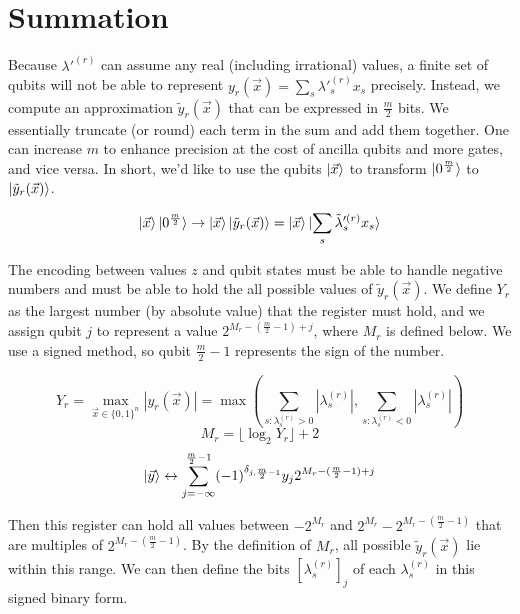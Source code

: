 \section{Summation}

Because $\lambda'^{(r)}$ can assume any real (including irrational) values, a finite set of qubits will not be able to represent $y_r(\vec{x}) = \sum_s \lambda'^{(r)}_s x_s$ precisely. Instead, we compute an approximation $\tilde{y}_r(\vec{x})$ that can be expressed in $\frac{m}{2}$ bits. We essentially truncate (or round) each term in the sum and add them together. One can increase $m$ to enhance precision at the cost of ancilla qubits and more gates, and vice versa. In short, we'd like to use the qubits $\ket{\vec{x}}$ to transform $\ket{0^{\frac{m}{2}}}$ to $\ket{\tilde{y}_r(\vec{x})}$.

\begin{equation}
    \ket{\vec{x}}\ket{0^{\frac{m}{2}}} \rightarrow \ket{\vec{x}}\ket{\tilde{y}_r(\vec{x})} = \ket{\vec{x}}\ket{\sum_s \tilde{\lambda}'^{(r)}_s x_s}
    \label{eq: summation2}
\end{equation}

The encoding between values $z$ and qubit states must be able to handle negative numbers and must be able to hold the all possible values of $\tilde{y}_r(\vec{x})$. We define $Y_r$ as the largest number (by absolute value) that the register must hold, and we assign qubit $j$ to represent a value $2^{M_r - (\frac{m}{2} - 1) + j}$, where $M_r$ is defined below. We use a signed method, so qubit $\frac{m}{2} - 1$ represents the sign of the number. 

\begin{equation}
    Y_r = \max_{\vec{x} \in \{0, 1\}^n} |y_r(\vec{x})| = \max\left(\sum_{s : \lambda^{(r)}_s > 0} |\lambda^{(r)}_s|, \sum_{s : \lambda^{(r)}_s < 0} |\lambda^{(r)}_s|\right)
\end{equation}
\begin{equation}
    M_r = \lfloor \log_2{Y_r} \rfloor + 2
\end{equation}
\begin{equation}
    \ket{\vec{y}} \leftrightarrow \sum_{j = -\infty}^{\frac{m}{2} - 1} (-1)^{\delta_{j, \frac{m}{2} - 1}}y_j2^{M_r - (\frac{m}{2} - 1) + j}
\end{equation}

Then this register can hold all values between $-2^{M_r}$ and $2^{M_r} - 2^{M_r - (\frac{m}{2} - 1)}$ that are multiples of $2^{M_r - (\frac{m}{2} - 1)}$. By the definition of $M_r$, all possible $\tilde{y}_r(\vec{x})$ lie within this range. We can then define the bits $[\lambda^{(r)}_s]_j$ of each $\lambda^{(r)}_s$ in this signed binary form.

